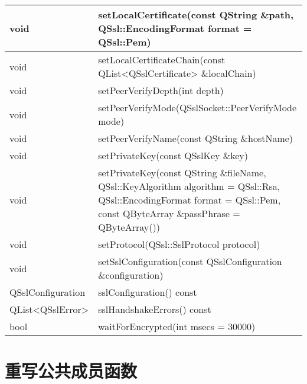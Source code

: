 \begin{longtable}[l]{|l|m{30em}|}
\hline
void 	&setLocalCertificate(const QString \&path, QSsl::EncodingFormat format = QSsl::Pem) \\ 
\hline
void &	setLocalCertificateChain(const QList<QSslCertificate> \&localChain) \\
\hline
void &	setPeerVerifyDepth(int depth) \\ 
\hline
void &	setPeerVerifyMode(QSslSocket::PeerVerifyMode mode) \\
\hline
void &	setPeerVerifyName(const QString \&hostName) \\ 
\hline
void &	setPrivateKey(const QSslKey \&key) \\ 
\hline 
void 	&setPrivateKey(const QString \&fileName, QSsl::KeyAlgorithm algorithm = QSsl::Rsa, QSsl::EncodingFormat format = QSsl::Pem, const QByteArray \&passPhrase = QByteArray()) \\ 
\hline
void &	setProtocol(QSsl::SslProtocol protocol) \\ 
\hline
void &	setSslConfiguration(const QSslConfiguration \&configuration) \\ 
\hline
QSslConfiguration &	sslConfiguration() const \\ 
\hline
QList<QSslError> 	&sslHandshakeErrors() const \\ 
\hline
bool 	&waitForEncrypted(int msecs = 30000) \\ 
\hline 
\end{longtable}

\section{重写公共成员函数}

